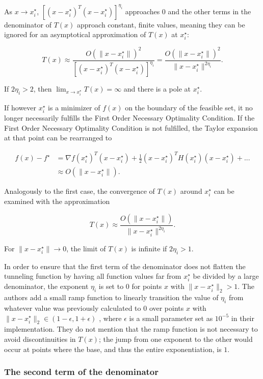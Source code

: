 \documentclass[a4paper,12pt,twoside]{article}
\begin{document}
As $x \to x_i^\star$, $[(x-x_i^\star)^T(x-x_i^\star)]^{\eta_i}$ approaches $0$ and the other terms in the denominator of $T(x)$ approach constant, finite values, meaning they can be ignored for an asymptotical approximation of $T(x)$ at $x_i^\star$:

\[
T(x) \approx \frac{O(\|x-x_i^\star\|)^2}{[(x-x_i^\star)^T(x-x_i^\star)]^{\eta_i}}
= \frac{O(\|x-x_i^\star\|)^2}{\|x-x_i^\star\|^{2\eta_i}}.
\]

If $2\eta_i > 2$, then $\lim_{x \to x_i^\star} T(x) = \infty $ and there is a pole at $x_i^\star$.

If however $x_i^\star$ is a minimizer of $f(x)$ on the boundary of the feasible set, it no longer necessarily fulfills the First Order Necessary Optimality Condition. If the First Order Necessary Optimality Condition is not fulfilled, the Taylor expansion at that point can be rearranged to

\begin{align*}
f(x) - f^\star &= \nabla f(x_i^\star)^T(x-x_i^\star) + \frac{1}{2} (x-x_i^\star)^T H(x_i^\star)(x-x_i^\star) + ... \\ 
&\approx O(\|x-x_i^\star\|).
\end{align*}


Analogously to the first case, the convergence of $T(x)$ around $x_i^\star$ can be examined with the approximation

\[
T(x) \approx \frac{O(\|x-x_i^\star\|)}{\|x-x_i^\star\|^{2\eta_i}}.
\]

For $\|x-x_i^\star\| \to 0$, the limit of $T(x)$ is infinite if $2\eta_i > 1$.

In order to ensure that the first term of the denominator does not flatten the tunneling function by having all function values far from $x_i^\star$ be divided by a large denominator, the exponent $\eta_i$ is set to $0$ for points $x$ with $\| x-x_i^\star \|_2 > 1$. The authors add a small ramp function to linearly transition the value of $\eta_i$ from whatever value was previously calculated to $0$ over points $x$ with $\| x-x_i^\star\|_2 \in (1-\epsilon, 1+\epsilon)$ \cite[Eq. A.5]{levy_tunneling_1985}, where $\epsilon$ is a small parameter set as $10^{-5}$ in their implementation. They do not mention that the ramp function is not necessary to avoid discontinuities in $T(x)$; the jump from one exponent to the other would occur at points where the base, and thus the entire exponentiation, is $1$. 


\subsubsection{The second term of the denominator}
\end{document}
